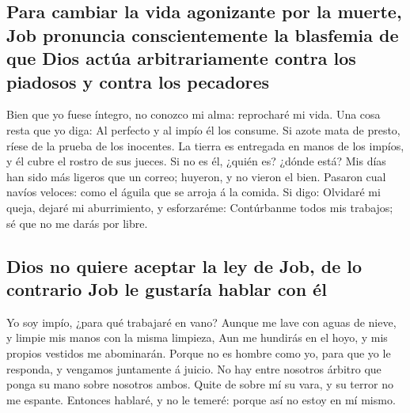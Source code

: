 \hypertarget{para-cambiar-la-vida-agonizante-por-la-muerte-job-pronuncia-conscientemente-la-blasfemia-de-que-dios-actuxfaa-arbitrariamente-contra-los-piadosos-y-contra-los-pecadores}{%
\subsection{Para cambiar la vida agonizante por la muerte, Job pronuncia
conscientemente la blasfemia de que Dios actúa arbitrariamente contra
los piadosos y contra los
pecadores}\label{para-cambiar-la-vida-agonizante-por-la-muerte-job-pronuncia-conscientemente-la-blasfemia-de-que-dios-actuxfaa-arbitrariamente-contra-los-piadosos-y-contra-los-pecadores}}

 Bien que yo fuese íntegro, no conozco mi alma:
reprocharé mi vida.  Una cosa resta que yo diga: Al
perfecto y al impío él los consume.  Si azote mata de
presto, ríese de la prueba de los inocentes.  La tierra
es entregada en manos de los impíos, y él cubre el rostro de sus jueces.
Si no es él, ¿quién es? ¿dónde está?  Mis días han sido
más ligeros que un correo; huyeron, y no vieron el bien. 
Pasaron cual navíos veloces: como el águila que se arroja á la comida.
 Si digo: Olvidaré mi queja, dejaré mi aburrimiento, y
esforzaréme:  Contúrbanme todos mis trabajos; sé que no
me darás por libre.

\hypertarget{dios-no-quiere-aceptar-la-ley-de-job-de-lo-contrario-job-le-gustaruxeda-hablar-con-uxe9l}{%
\subsection{Dios no quiere aceptar la ley de Job, de lo contrario Job le
gustaría hablar con
él}\label{dios-no-quiere-aceptar-la-ley-de-job-de-lo-contrario-job-le-gustaruxeda-hablar-con-uxe9l}}

 Yo soy impío, ¿para qué trabajaré en vano?
 Aunque me lave con aguas de nieve, y limpie mis manos
con la misma limpieza,  Aun me hundirás en el hoyo, y mis
propios vestidos me abominarán.  Porque no es hombre como
yo, para que yo le responda, y vengamos juntamente á juicio.
 No hay entre nosotros árbitro que ponga su mano sobre
nosotros ambos.  Quite de sobre mí su vara, y su terror
no me espante.  Entonces hablaré, y no le temeré: porque
así no estoy en mí mismo.

